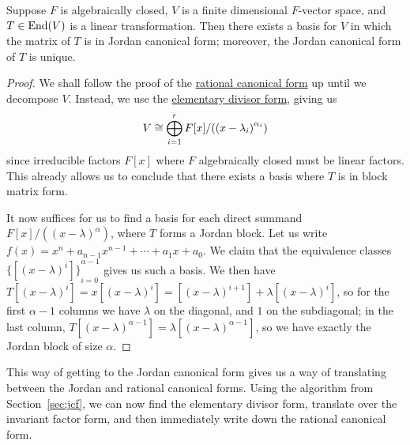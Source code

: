 \begin{theorem}
    Suppose \(F\) is algebraically closed,
    \(V\) is a finite dimensional \(F\)-vector space,
    and \(T \in \operatorname{End}(V)\) is a linear transformation.
    Then there exists a basis for \(V\)
    in which the matrix of \(T\) is in Jordan canonical form;
    moreover, the Jordan canonical form of \(T\) is unique.
\end{theorem}
\begin{proof}
    We shall follow the proof of the \hyperref[thm:rational-canonical-form]{rational canonical form}
    up until we decompose \(V\).
    Instead, we use the \hyperref[thm:structure-divisor]{elementary divisor form},
    giving us
    \begin{equation*}
        V \cong \bigoplus_{i=1}^r F[x]/\pqty{{(x-\lambda_i)}^{\alpha_i}}
    \end{equation*}
    since irreducible factors \(F[x]\) where \(F\) algebraically closed
    must be linear factors.
    This already allows us to conclude that there exists a basis
    where \(T\) is in block matrix form.
    
    It now suffices for us to find a basis for each direct summand \(F[x]/({(x-\lambda)}^\alpha)\),
    where \(T\) forms a Jordan block.
    Let us write \(f(x) = x^n + a_{n-1}x^{n-1} + \cdots + a_1x + a_0\).
    We claim that the equivalence classes \({\{[{(x-\lambda)}^i]\}}_{i=0}^{\alpha-1}\) gives us such a basis.
    We then have \(T[{(x-\lambda)}^i] = x[{(x-\lambda)}^i] = [{(x-\lambda)}^{i+1}] + \lambda[{(x-\lambda)}^i]\),
    so for the first \(\alpha-1\) columns we have \(\lambda\) on the diagonal,
    and \(1\) on the subdiagonal;
    in the last column, \(T[{(x-\lambda)}^{\alpha-1}] = \lambda[{(x-\lambda)}^{\alpha-1}]\),
    so we have exactly the Jordan block of size \(\alpha\).
\end{proof}
\begin{remark}
    This way of getting to the Jordan canonical form
    gives us a way of translating between the Jordan and rational canonical forms.
    Using the algorithm from Section~\ref{sec:jcf},
    we can now find the elementary divisor form,
    translate over the invariant factor form,
    and then immediately write down the rational canonical form.
\end{remark}

